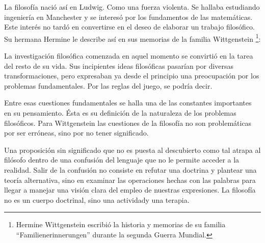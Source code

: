 La filosofía nació así en Ludwig. Como una fuerza violenta. Se hallaba
estudiando ingeniería en Manchester y se interesó por los fundamentos de las
matemáticas. Este interés no tardó en convertirse en el deseo de elaborar un
trabajo filosófico. Su hermana Hermine le describe así en sus memorias de la
familia Wittgenstein
\footnote{Hermine Wittgenstein escribió la historia y memorias de su familia
  ``Familienerinnerungen'' durante la segunda Guerra Mundial.}:


La investigación filosófica comenzada en aquel momento se convirtió en la tarea
del resto de su vida. Sus incipientes ideas filosóficas pasarían por diversas
transformaciones, pero expresaban ya desde el principio una preocupación por los
problemas fundamentales. Por las reglas del juego, se podría decir.

Entre esas cuestiones fundamentales se halla una de las constantes importantes
en su pensamiento. Ésta es su definición de la naturaleza de los problemas
filosóficos. Para Wittgenstein las cuestiones de la filosofía no son
problemáticas por ser erróneas, sino por no tener
significado.\autocite[cf.~][4.003]{tractatus}

Una proposición sin significado que no es puesta al descubierto como tal atrapa
al filósofo dentro de una confusión del lenguaje que no le permite acceder a la
realidad. Salir de la confusión no consiste en refutar una doctrina y plantear
una teoría alternativa, sino en examinar las operaciones hechas con las palabras
para llegar a manejar una visión clara del empleo de nuestras expresiones. La
filosofía no es un cuerpo doctrinal, sino una
actividad\autocite[cf.~][4.112]{tractatus}y una
terapia\autocite[cf.~][\S133]{PI}.

